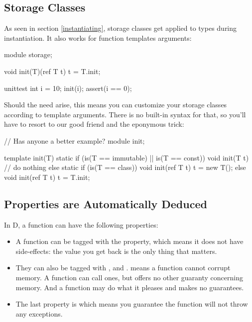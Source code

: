 
\subsection{Storage Classes}\label{storageclasses}

As seen in section \ref{instantiating}, storage classes get applied to types during instantiation. It also works for function templates arguments:

\begin{dcode}
module storage;

void init(T)(ref T t)
{ 
    t = T.init;
}

unittest
{
    int i = 10;
    init(i);
    assert(i == 0);
}
\end{dcode}

Should the need arise, this means you can customize your storage classes according to template arguments. There is no built-in syntax for that, so you'll have to resort to our good friend  and the eponymous trick:

\begin{dcode}
// Has anyone a better example?
module init;

template init(T)
{
    static if (is(T == immutable) || is(T == const))
        void init(T t) {} // do nothing
    else static if (is(T == class))
        void init(ref T t)
        {
            t = new T();
        }
    else 
        void init(ref T t)
        {
            t = T.init;
        }
}
\end{dcode}

\subsection{Properties are Automatically Deduced}\label{autodeduce}

In D, a function can have the following properties:

\begin{itemize}
\item A function can be tagged with the  property, which means it does not have side-effects: the value you get back is the only thing that matters. 
\item They can also be tagged with ,  and .  means a function cannot corrupt memory. A  function can call  ones, but offers no other guaranty concerning memory. And a  function may do what it pleases and makes no guarantees.
\item The last property is  which means you guarantee the function will not throw any exceptions.
\end{itemize}

